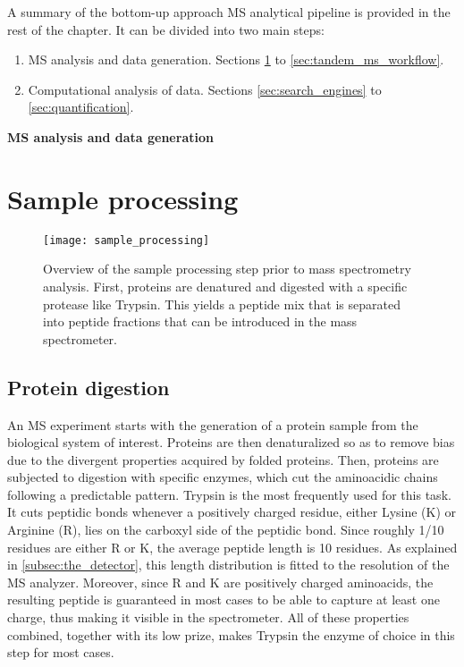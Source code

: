 A summary of the bottom-up approach MS analytical pipeline is provided in the rest of the chapter. It can be divided into two main steps:

\begin{enumerate}

\item \ac{MS} analysis and data generation. Sections \ref{sec:sample_processing} to \ref{sec:tandem_ms_workflow}.

\item Computational analysis of data. Sections \ref{sec:search_engines} to \ref{sec:quantification}.

\end{enumerate}

\LARGE
\textbf{MS analysis and data generation}
\normalsize

\section{Sample processing}
\label{sec:sample_processing}

\begin{figure}[!h]
\texttt{[image: sample\_processing]}
\caption{Overview of the sample processing step prior to mass spectrometry analysis. First, proteins are denatured and digested with a specific protease like Trypsin. This yields a peptide mix that is separated into peptide fractions that can be introduced in the mass spectrometer.}
\label{fig:sample_processing}
\end{figure}

\subsection{Protein digestion}
\label{subsec:protein_digestion}

An \ac{MS} experiment starts with the generation of a protein sample from the biological system of interest. Proteins are then denaturalized  so as to remove bias due to the divergent properties acquired by folded proteins. Then, proteins are subjected to digestion with specific enzymes, which cut the aminoacidic chains following a predictable pattern. Trypsin is the most frequently used for this task. It cuts peptidic bonds whenever a positively charged residue, either Lysine (K) or Arginine (R), lies on the carboxyl side of the peptidic bond. Since roughly 1/10 residues are either R or K, the average peptide length is 10 residues. As explained in \ref{subsec:the_detector}, this length distribution is fitted to the resolution of the MS analyzer. Moreover, since R and K are positively charged aminoacids, the resulting peptide is guaranteed in most cases to be able to capture at least one charge, thus making it visible in the spectrometer. All of these properties combined, together with its low prize, makes Trypsin the enzyme of choice in this step for most cases.

